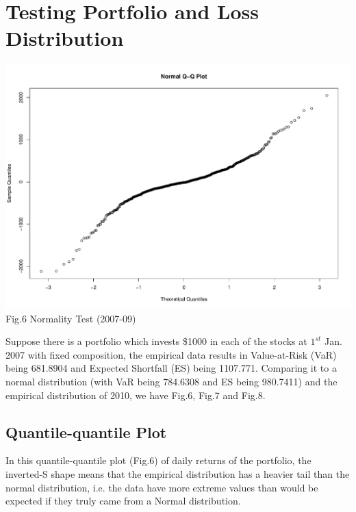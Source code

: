\documentclass[11pt]{article}
\begin{document}
\section{Testing Portfolio and Loss Distribution}\vspace{-1em} 
\begin{center}
  \includegraphics[width=0.85\linewidth]{graph/NormalQQPlot200709.pdf}\\
  Fig.6 Normality Test (2007-09)
\end{center}
Suppose there is a portfolio which invests \$1000 in each of the stocks at $1^{st}$ Jan. 2007 with fixed composition, the empirical data results in Value-at-Risk (VaR) being 681.8904 and Expected Shortfall (ES) being 1107.771. Comparing it to a normal distribution (with VaR being 784.6308 and ES being 980.7411) and the empirical distribution of 2010, we have Fig.6, Fig.7 and Fig.8.

\vspace{-1em}\subsection{Quantile-quantile Plot}\vspace{-1em} 
In this quantile-quantile plot (Fig.6) of daily returns of the portfolio, the inverted-S shape means that the empirical distribution has a heavier tail than the normal distribution, i.e. the data have more extreme values than would be expected if they truly came from a Normal distribution.
\end{document}
